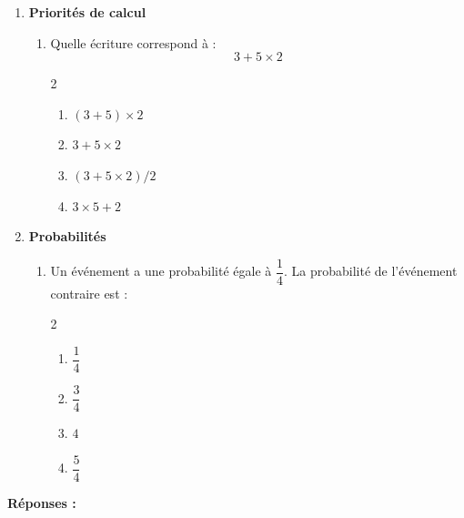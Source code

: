 \documentclass[12pt,a4paper]{article}
\begin{document}
\begin{enumerate}
\item \textbf{Priorités de calcul}

\begin{enumerate}[label=\arabic{*}.\arabic*]
\item Quelle écriture correspond à :
\[
3 + 5 \times 2
\]
\begin{multicols}{2}
\begin{enumerate}[label=\alph*)]
\item $(3 + 5) \times 2$
\item $3 + 5 \times 2$
\item $(3 + 5 \times 2) / 2$
\item $3 \times 5 + 2$
\end{enumerate}
\end{multicols}
\end{enumerate}

\item \textbf{Probabilités}

\begin{enumerate}[label=\arabic{*}.\arabic*]
\item Un événement a une probabilité égale à $\dfrac{1}{4}$.  
La probabilité de l’événement contraire est :
\begin{multicols}{2}
\begin{enumerate}[label=\alph*)]
\item $\dfrac{1}{4}$
\item $\dfrac{3}{4}$
\item $4$
\item $\dfrac{5}{4}$
\end{enumerate}
\end{multicols}
\end{enumerate}

\end{enumerate}

\vspace{0.5cm}
\textbf{Réponses :} \dotfill
\end{document}
